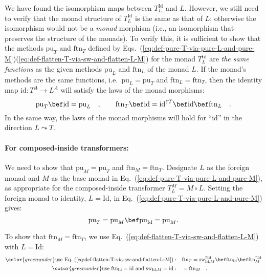We have found the isomorphism maps between $T_{L}^{\text{Id}}$ and
$L$. However, we still need to verify that the monad structure of
$T_{L}^{\text{Id}}$ is the same as that of $L$; otherwise the isomorphism
would not be a \emph{monad} morphism (i.e., an isomorphism that preserves
the structure of the monads). To verify this, it is sufficient to
show that the methods $\text{pu}_{T}$ and $\text{ftn}_{T}$ defined
by Eqs.~(\ref{eq:def-pure-T-via-pure-L-and-pure-M})\textendash (\ref{eq:def-flatten-T-via-sw-and-flatten-L-M})
for the monad $T_{L}^{\text{Id}}$ are \emph{the same functions} as
the given methods $\text{pu}_{L}$ and $\text{ftn}_{L}$ of the monad
$L$. If the monad\textsf{'}s methods are the same functions, i.e.~$\text{pu}_{L}=\text{pu}_{T}$
and $\text{ftn}_{L}=\text{ftn}_{T}$, then the identity map $\text{id}:T^{A}\rightarrow L^{A}$
will satisfy the laws of the monad morphisms:
\[
\text{pu}_{T}\bef\text{id}=\text{pu}_{L}\quad,\quad\quad\text{ftn}_{T}\bef\text{id}=\text{id}^{\uparrow T}\bef\text{id}\bef\text{ftn}_{L}\quad.
\]
In the same way, the laws of the monad morphisms will hold for \textsf{``}$\text{id}$\textsf{''}
in the direction $L\leadsto T$. 

\paragraph{For composed-inside transformers:}

We need to show that $\text{pu}_{M}=\text{pu}_{T}$ and $\text{ftn}_{M}=\text{ftn}_{T}$.
Designate $L$ as the foreign monad and $M$ as the base monad in
Eq.~(\ref{eq:def-pure-T-via-pure-L-and-pure-M}), as appropriate
for the composed-inside transformer $T_{L}^{M}=M\circ L$. Setting
the foreign monad to identity, $L=\text{Id}$, in Eq.~(\ref{eq:def-pure-T-via-pure-L-and-pure-M})
gives:
\[
\text{pu}_{T}=\text{pu}_{M}\bef\text{pu}_{\text{Id}}=\text{pu}_{M}.
\]

To show that $\text{ftn}_{M}=\text{ftn}_{T}$, we use Eq.~(\ref{eq:def-flatten-T-via-sw-and-flatten-L-M})
with $L=\text{Id}$:
\begin{align*}
{\color{greenunder}\text{use Eq.~(\ref{eq:def-flatten-T-via-sw-and-flatten-L-M})}:}\quad & \text{ftn}_{T}=\text{sw}_{\text{Id},M}^{\uparrow\text{Id}}\bef\text{ftn}_{\text{Id}}\bef\text{ftn}_{M}^{\uparrow\text{Id}}\\
{\color{greenunder}\text{use }\text{ftn}_{\text{Id}}=\text{id}\text{ and }\text{sw}_{\text{Id},M}=\text{id}:}\quad & =\text{ftn}_{M}\quad.
\end{align*}


